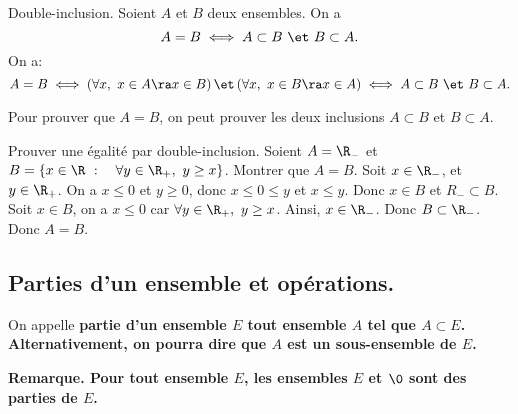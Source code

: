 \documentclass[11pt]{article}
\begin{document}
\begin{thm}{Double-inclusion.}{}
    Soient $A$ et $B$ deux ensembles. On a
    \begin{equation*}
        A=B\iff A\subset B~\et~ B\subset A.
    \end{equation*}
    \tcblower
    On a:
    \begin{equation*}
        A = B \iff \left( \forall x, ~ x \in A \ra x \in B \right) \et \left( \forall x, ~ x \in B \ra x \in A \right) \iff A \subset B ~\et~ B \subset A.
    \end{equation*}
\end{thm}

\begin{meth}{}{}
    Pour prouver que $A=B$, on peut prouver les deux inclusions $A\subset B$ et $B\subset A$.
\end{meth}

\begin{ex}{Prouver une égalité par double-inclusion.}{}
    Soient $A=\R_-$ et $B=\{x\in\R~:\quad\forall y \in \R_+,~y\geq x\}$. Montrer que $A=B$.
    \tcblower
    Soit $x\in \R_-$, et $y\in\R_+$. On a $x\leq0$ et $y\geq0$, donc $x\leq0\leq y$ et $x\leq y$. Donc $x\in B$ et $R_-\subset B$.\\
    Soit $x\in B$, on a $x\leq0$ car $\forall y \in \R_+,~y\geq x$. Ainsi, $x\in\R_-$. Donc $B\subset\R_-$.\\
    Donc $A=B$.
\end{ex}

\subsection{Parties d'un ensemble et opérations.}

\begin{defi}{}{}
    On appelle \bf{partie} d'un ensemble $E$ tout ensemble $A$ tel que $A\subset E$.\\
    Alternativement, on pourra dire que $A$ est un sous-ensemble de $E$.
\end{defi}

\bf{Remarque.} Pour tout ensemble $E$, les ensembles $E$ et $\0$ sont des parties de $E$.
\end{document}
